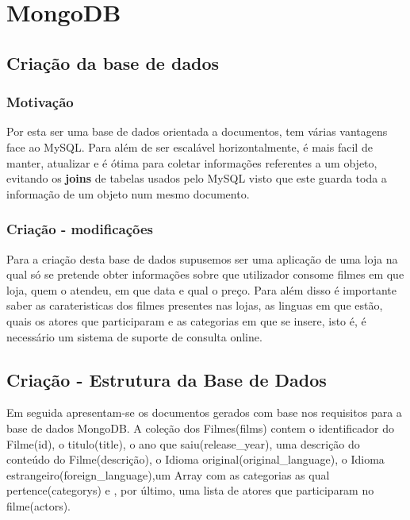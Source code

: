 \newpage

\section{MongoDB}

\subsection{Criação da base de dados}

\subsubsection{Motivação}\hfill
\newline
\par Por esta ser uma base de dados orientada a documentos, tem várias vantagens face ao MySQL. Para além de ser escalável horizontalmente, é mais facil de manter, atualizar e é ótima para coletar informações referentes a um objeto, evitando os \textbf{joins} de tabelas usados pelo MySQL visto que este guarda toda a informação de um objeto num mesmo documento.

\subsubsection{Criação - modificações}\hfill
\newline
\par Para a criação desta base de dados supusemos ser uma aplicação de uma loja na qual só se pretende obter informações sobre que utilizador consome filmes em que loja, quem o atendeu, em que data e qual o preço. Para além disso é importante saber as carateristicas dos filmes presentes nas lojas, as linguas em que estão, quais os atores que participaram e as categorias em que se insere, isto é, é necessário um sistema de suporte de consulta online.

\subsection{Criação - Estrutura da Base de Dados}

\par Em seguida apresentam-se os documentos gerados com base nos requisitos para a base de dados MongoDB. A coleção dos Filmes(films) contem o identificador do Filme(id), o titulo(title), o ano que saiu(release\_year), uma descrição do conteúdo do Filme(descrição), o Idioma original(original\_language), o Idioma estrangeiro(foreign\_language),um Array com as categorias as qual pertence(categorys) e , por último, uma lista de atores que participaram no filme(actors).\newline

